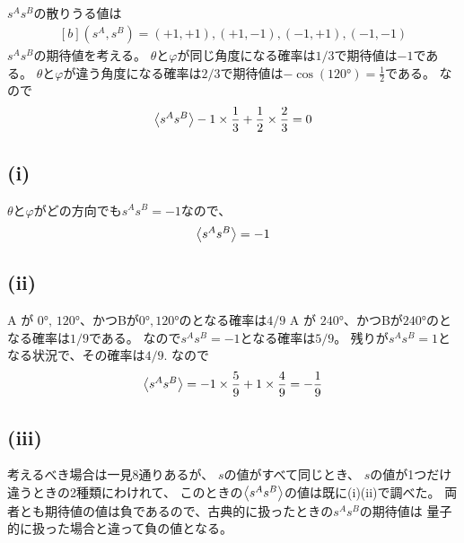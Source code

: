 \documentclass[../../sp_2019.tex]{subfiles}
\begin{document}
\subsection{}
\(s^As^B\)の散りうる値は
\begin{equation}\begin{aligned}[b]
    (s^A,s^B)=(+1,+1),(+1,-1),(-1,+1),(-1,-1)
\end{aligned}\end{equation}
\(s^As^B\)の期待値を考える。
\(\theta\)と\(\varphi\)が同じ角度になる確率は\(1/3\)で期待値は\(-1\)である。
\(\theta\)と\(\varphi\)が違う角度になる確率は\(2/3\)で期待値は\(-\cos(\ang{120})=\frac{1}{2}\)である。
なので
\begin{equation}\begin{aligned}[b]
    \ev{s^As^B}  -1\times\frac{1}{3} + \frac{1}{2}\times \frac{2}{3} = 0
\end{aligned}\end{equation}

\subsection{}
\subsection*{(i)}
\(\theta\)と\(\varphi\)がどの方向でも\(s^As^B=-1\)なので、
\begin{equation}\begin{aligned}[b]
    \ev{s^As^B} = -1
\end{aligned}\end{equation}
\subsection*{(ii)}
A が \(\ang{0},\,\ang{120}\)、かつBが\(\ang{0},\ang{120}\)のとなる確率は\(4/9\)
A が \(\ang{240}\)、かつBが\(\ang{240}\)のとなる確率は\(1/9\)である。
なので\(s^As^B=-1\)となる確率は\(5/9\)。
残りが\(s^As^B=1\)となる状況で、その確率は\(4/9\).
なので
\begin{equation}\begin{aligned}[b]
    \ev{s^As^B} = -1\times \frac{5}{9}+1\times\frac{4}{9} = -\frac{1}{9}
\end{aligned}\end{equation}

\subsection*{(iii)}
考えるべき場合は一見\(8\)通りあるが、
\(s\)の値がすべて同じとき、
\(s\)の値が1つだけ違うときの2種類にわけれて、
このときの\(\ev{s^As^B}\)の値は既に(i)(ii)で調べた。
両者とも期待値の値は負であるので、古典的に扱ったときの\(s^As^B\)の期待値は
量子的に扱った場合と違って負の値となる。
\end{document}
